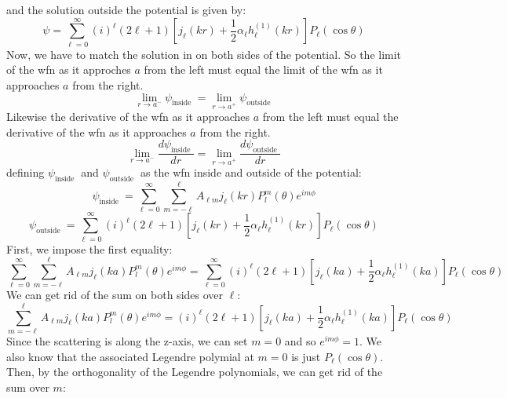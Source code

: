 \documentclass[12pt]{article}
\begin{document}
and the solution outside the potential is given by:
\begin{equation}
\psi=\sum_{\ell=0}^{\infty}(i)^{\ell}(2 \ell+1)\left[j_{\ell}(k r)+\frac{1}{2} \alpha_{\ell} h_{\ell}^{(1)}(k r)\right] P_{\ell}(\cos \theta)
\end{equation}
Now, we have to match the solution in on both sides of the potential. So the limit of the wfn as it approches $a$ from the left must equal the limit of the wfn as it approaches $a$ from the right.
\begin{equation}
\lim _{r \rightarrow a^-} \psi_{\text {inside }}=\lim _{r \rightarrow a^+} \psi_{\text {outside }}
\end{equation}
Likewise the derivative of the wfn as it approaches $a$ from the left must equal the derivative of the wfn as it approaches $a$ from the right.
\begin{equation}
\lim _{r \rightarrow a^-} \frac{d \psi_{\text {inside }}}{d r}=\lim _{r \rightarrow a^+} \frac{d \psi_{\text {outside }}}{d r}
\end{equation}
defining $\psi_{\text {inside }}$ and $\psi_{\text {outside }}$ as the wfn inside and outside of the potential:
\begin{equation}
\psi_{\text {inside }}=\sum_{\ell=0}^{\infty} \sum_{m=-\ell}^{\ell}A_{\ell m} j_{\ell}(k r) P_l^m(\theta) e^{i m \phi}
\end{equation}
\begin{equation}
\psi_{\text {outside }}=\sum_{\ell=0}^{\infty}(i)^{\ell}(2 \ell+1)\left[j_{\ell}(k r)+\frac{1}{2} \alpha_{\ell} h_{\ell}^{(1)}(k r)\right] P_{\ell}(\cos \theta)
\end{equation}
First, we impose the first equality:
\begin{equation}
\sum_{\ell=0}^{\infty} \sum_{m=-\ell}^{\ell}A_{\ell m} j_{\ell}(k a) P_l^m(\theta) e^{i m \phi}= \sum_{\ell=0}^{\infty}(i)^{\ell}(2 \ell+1)\left[j_{\ell}(k a)+\frac{1}{2} \alpha_{\ell} h_{\ell}^{(1)}(k a)\right] P_{\ell}(\cos \theta)
\end{equation}
We can get rid of the sum on both sides over $\ell$:
\begin{equation}
\sum_{m=-\ell}^{\ell}A_{\ell m} j_{\ell}(k a) P_l^m(\theta) e^{i m \phi}= (i)^{\ell}(2 \ell+1)\left[j_{\ell}(k a)+\frac{1}{2} \alpha_{\ell} h_{\ell}^{(1)}(k a)\right] P_{\ell}(\cos \theta)
\end{equation}
Since the scattering is along the z-axis, we can set $m=0$ and so $e^{i m \phi}=1$. We also know that the associated Legendre polymial at $m=0$ is just $P_{\ell}(\cos \theta)$. Then, by the orthogonality of the Legendre polynomials, we can get rid of the sum over $m$:
\end{document}
